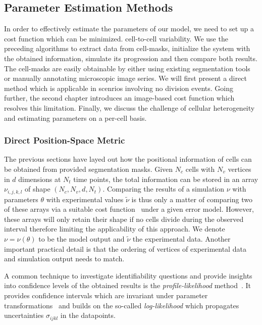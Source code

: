 \documentclass[10pt,letterpaper]{article}
\begin{document}
\subsection{Parameter Estimation Methods}
\label{section:parameter-estimation}
In order to effectively estimate the parameters of our model, we need to set up a cost function
which can be minimized.
cell-to-cell variability.
We use the preceding algorithms to extract data from cell-masks, initialize the system with the
obtained information, simulate its progression and then compare both results.
The cell-masks are easily obtainable by either using existing segmentation
tools~\cite{Cutler2022,Stringer2020,Hardo2022} or manually annotating microscopic image series.
We will first present a direct method which is applicable in scenrios involving no division events.
Going further, the second chapter introduces an image-based cost function which resolves this
limitation.
Finally, we discuss the challenge of cellular heterogeneity and estimating parameters on a per-cell
basis.

\subsubsection{Direct Position-Space Metric}
\label{subsec:direct-metric}
The previous sections have layed out how the positional information of cells can be obtained from
provided segmentation masks.
Given $N_c$ cells with $N_v$ vertices in $d$ dimensions at $N_t$ time points, the total information
can be stored in an array $\nu_{i,j,k,l}$ of shape $(N_c,N_v,d,N_t)$.
Comparing the results of a simulation $\nu$ with parameters $\theta$ with experimental values
$\tilde{\nu}$ is thus only a matter of comparing two of these arrays via a suitable cost
function~\cite{Wang2020} under a given error model.
However, these arrays will only retain their shape if no cells divide during the observed interval
therefore limiting the applicability of this approach.
We denote $\nu=\nu(\theta)$ to be the model output and $\tilde{\nu}$ the experimental data.
Another important practical detail is that the ordering of vertices of experimental data and
simulation output needs to match.

A common technique to investigate identifiability questions and provide insights into confidence
levels of the obtained results is the \textit{profile-likelihood}
method~\cite{Murphy2000,Kreutz2013,Tnsing2023}.
It provides confidence intervals which are invariant under parameter
transformations~\cite{Meeker1995} and  builds on the so-called \textit{log-likelihood} which
propagates uncertainties $\sigma_{ijkl}$ in the datapoints.
\end{document}
